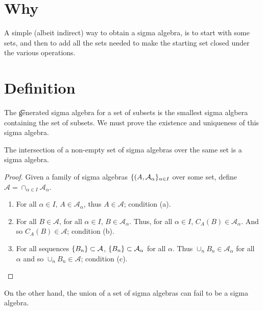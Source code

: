 

\section*{Why}

A simple (albeit indirect) way to obtain a sigma algebra, is to start with some sets, and then to add all the sets needed to make the starting set closed under the various operations.

\section*{Definition}

The \t{generated sigma algebra} for a set of subsets is the smallest sigma algbera containing the set of subsets.
We must prove the existence and uniqueness of this sigma algebra.

\begin{proposition}

\label{intersectsigmalgebras}The intersection of a non-empty set of sigma algebras over the same set is a sigma algebra.\end{proposition}
\begin{proof}Given a family of sigma algebras $\{(A, \mathcal{A} _\alpha \}_{\alpha  \in I}$ over some set, define $\mathcal{A}  = \cap _{\alpha  \in I} \mathcal{A} _\alpha $.
  \begin{enumerate}
    \item For all $\alpha  \in I$, $A \in \mathcal{A} _{\alpha }$, thus $A \in \mathcal{A} $; condition (a).
    \item For all $B \in \mathcal{A} $, for all $\alpha  \in I$, $B \in \mathcal{A} _{\alpha }$.
Thus, for all $\alpha  \in I$, $C_{A}(B) \in \mathcal{A} _{\alpha }$.
And so $C_{A}(B) \in \mathcal{A} $; condition (b).
    \item For all sequences $\{B_n\} \subset \mathcal{A} $, $\{B_n\} \subset \mathcal{A} _{\alpha }$ for all $\alpha $.
Thus $\cup_{n} B_n \in \mathcal{A} _{\alpha }$ for all $\alpha $ and so $\cup_{n} B_n \in \mathcal{A} $; condition (c).
  \end{enumerate}\end{proof}
On the other hand, the union of a set of sigma algebras can fail to be a sigma algebra.


